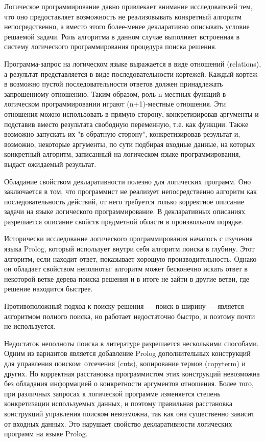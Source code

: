 
{\actuality}
Логическое программирование давно привлекает внимание исследователей тем, что оно предоставляет возможность не реализовывать конкретный алгоритм непосредственно, а вместо этого более-менее декларативно описывать условие решаемой задачи. Роль алгоритма в данном случае выполняет встроенная в систему логического программирования процедура поиска решения.

Программа-запрос на логическом языке выражается в виде отношений (relations), а результат представляется в виде последовательности кортежей.
Каждый кортеж в возможно пустой последовательности ответов должен принадлежать запрошенному отношению. Таким образом, роль n-местных функций в логическом программировании играют (n+1)-местные отношения. Эти отношения можно использовать в прямую сторону, конкретизировав аргументы и подставив вместо результата свободную переменную, т.е. как функции. Также возможно  запускать их "в обратную сторону", конкретизировав результат и, возможно, некоторые аргументы, по сути подбирая входные данные, на которых конкретный алгоритм, записанный на логическом языке программирования, выдаст ожидаемый результат.

Обладание свойством декларативности полезно для логических программ. Оно заключается в том, что программист не реализует непосредственно алгоритм как последовательность действий, от него требуется только корректное описание задачи на языке логического программирование. В декларативных описаниях разрешается описание свойств предметной области в произвольном порядке.

Исторически исследование логического программирования началось с изучения языка Prolog, который использует внутри себя  алгоритм поиска в глубину. Этот алгоритм, если находит ответ, показывает хорошую производительность. Однако он обладает свойством неполноты: алгоритм может бесконечно искать ответ в некоторой ветке дерева поиска решения и в итоге не зайти в другие ветви, где решение находится быстрее.

Противоположный подход к поиску решения --- поиск в ширину --- является алгоритмом полного поиска, но работает недостаточно быстро, и поэтому почти не используется.

Недостаток неполноты поиска в литературе разрешается несколькими способами. Одним из вариантов является добавление Prolog дополнительных конструкций для управления поиском: отсечения (cuts), копирование термов (copyterm) и других. Но корректная расстановка программистом этих конструкций невозможна без обладания информацией о конкретности аргументов отношения. Более того, при различных запросах к логической программе изменяется степень конкретизации используемых данных, и поэтому правильная расстановка конструкций управления поиском невозможна, так как она существенно зависит от входных данных. Это нарушает свойство декларативности логических программ на языке Prolog.

